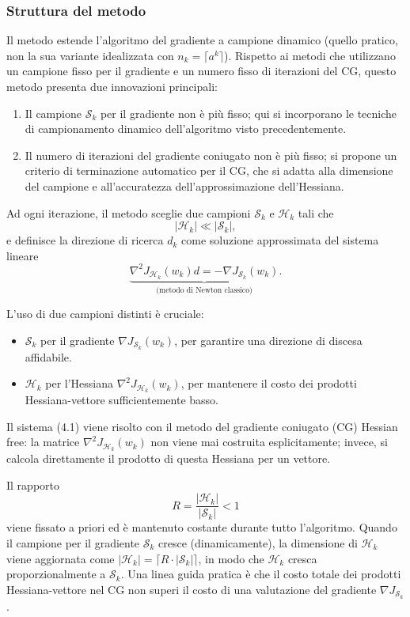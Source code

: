 \documentclass[a4paper,12pt]{article}
\begin{document}
\subsubsection{Struttura del metodo}

Il metodo estende l'algoritmo del gradiente a campione dinamico (quello pratico, non la sua variante idealizzata con \(n_k = \lceil a^k \rceil\)). Rispetto ai metodi che utilizzano un campione fisso per il gradiente e un numero fisso di iterazioni del CG, questo metodo presenta due innovazioni principali:

\begin{enumerate}
    \item Il campione \(\mathcal{S}_k\) per il gradiente non è più fisso; qui si incorporano le tecniche di campionamento dinamico dell'algoritmo visto precedentemente.
    \item Il numero di iterazioni del gradiente coniugato non è più fisso; si propone un criterio di terminazione automatico per il CG, che si adatta alla dimensione del campione e all'accuratezza dell'approssimazione dell'Hessiana.
\end{enumerate}

Ad ogni iterazione, il metodo sceglie due campioni \(\mathcal{S}_k\) e \(\mathcal{H}_k\) tali che
\[
|\mathcal{H}_k| \ll |\mathcal{S}_k|,
\]
e definisce la direzione di ricerca \(d_k\) come soluzione approssimata del sistema lineare
\[
\underbrace{\nabla^2 J_{\mathcal{H}_k}(w_k) d = -\nabla J_{\mathcal{S}_k}(w_k)}_{\text{(metodo di Newton classico)}}. \tag{4.1}
\]

L'uso di due campioni distinti è cruciale:
\begin{itemize}
    \item \(\mathcal{S}_k\) per il gradiente \(\nabla J_{\mathcal{S}_k}(w_k)\), per garantire una direzione di discesa affidabile.
    \item \(\mathcal{H}_k\) per l'Hessiana \(\nabla^2 J_{\mathcal{H}_k}(w_k)\), per mantenere il costo dei prodotti Hessiana-vettore sufficientemente basso.
\end{itemize}

Il sistema (4.1) viene risolto con il metodo del gradiente coniugato (CG) Hessian free: la matrice \(\nabla^2 J_{\mathcal{H}_k}(w_k)\) non viene mai costruita esplicitamente; invece, si calcola direttamente il prodotto di questa Hessiana per un vettore.

Il rapporto
\[
R = \frac{|\mathcal{H}_k|}{|\mathcal{S}_k|} < 1 \tag{4.2}
\]
viene fissato a priori ed è mantenuto costante durante tutto l'algoritmo. Quando il campione per il gradiente \(\mathcal{S}_k\) cresce (dinamicamente), la dimensione di \(\mathcal{H}_k\) viene aggiornata come \(|\mathcal{H}_k| = \lceil R \cdot |\mathcal{S}_k|\rceil\), in modo che \(\mathcal{H}_k\) cresca proporzionalmente a \(\mathcal{S}_k\). Una linea guida pratica è che il costo totale dei prodotti Hessiana-vettore nel CG non superi il costo di una valutazione del gradiente \(\nabla J_{\mathcal{S}_k}\).
\end{document}
